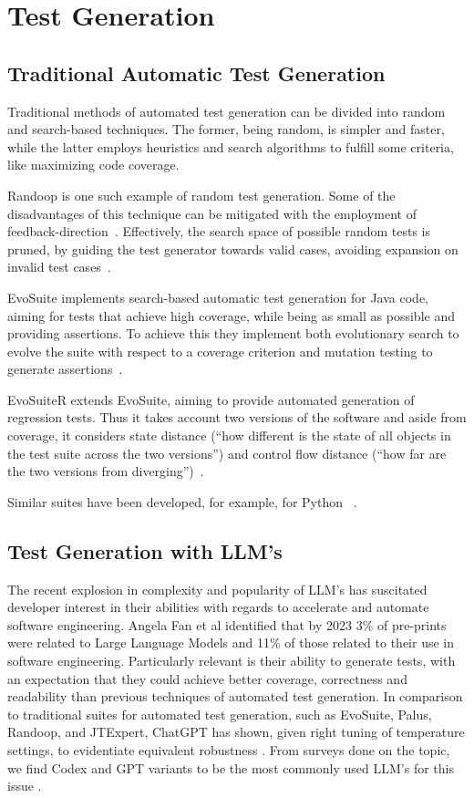 \section{Test Generation}

\subsection{Traditional Automatic Test Generation}

Traditional methods of automated test generation can be divided into random and search-based techniques. The former, being random, is simpler and faster, while the latter employs heuristics and search algorithms to fulfill some criteria, like maximizing code coverage.

Randoop is one such example of random test generation. Some of the disadvantages of this technique can be mitigated with the employment of feedback-direction~\citep{kn:randoop}. Effectively, the search space of possible random tests is pruned, by guiding the test generator towards valid cases, avoiding expansion on invalid test cases~\citep{kn:randoop}.

EvoSuite implements search-based automatic test generation for Java code, aiming for tests that achieve high coverage, while being as small as possible and providing assertions. To achieve this they implement both evolutionary search to evolve the suite with respect to a coverage criterion and mutation testing to generate assertions~\citep{kn:evosuite}.

EvoSuiteR extends EvoSuite, aiming to provide automated generation of regression tests. Thus it takes account two versions of the software and aside from coverage, it considers state distance (``how different is the state of
all objects in the test suite across the two versions'') and control flow distance (``how
far are the two versions from diverging'')~\citep{kn:evosuiter}.


Similar suites have been developed, for example, for Python ~\citep{kn:pynguin}.

\subsection{Test Generation with LLM's}

The recent explosion in complexity and popularity of LLM's has suscitated developer interest in their abilities with regards to accelerate and automate software engineering. Angela Fan et al identified that by 2023 3\% of pre-prints were related to Large Language Models and 11\% of those related to their use in software engineering\cite{kn:angela}. Particularly relevant is their ability to generate tests, with an expectation that they could achieve better coverage, correctness and readability than previous techniques of automated test generation\cite{kn:junjiewang}.
In comparison to traditional suites for automated test generation, such as EvoSuite, Palus, Randoop, and JTExpert, ChatGPT has shown, given right tuning of temperature settings, to evidentiate equivalent robustness \cite{kn:gptunitbra}.
From surveys done on the topic, we find Codex and GPT variants to be the most commonly used LLM's for this issue \cite{kn:junjiewang}.

